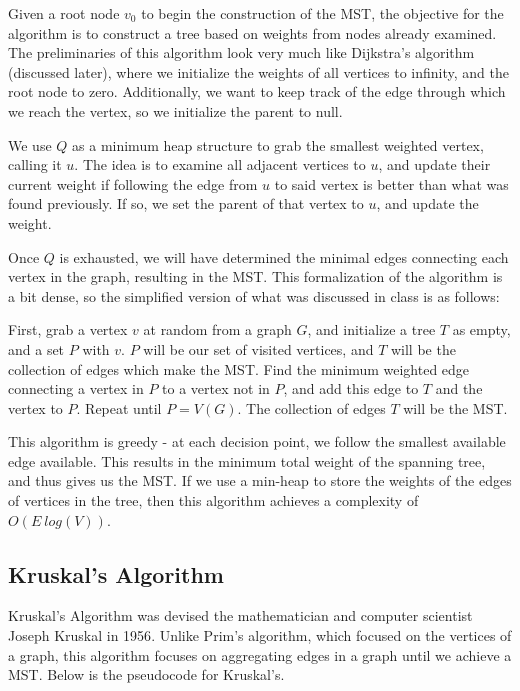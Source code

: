 Given a root node $v_0$ to begin the construction of the MST, the objective for the algorithm is to construct a tree based on weights from nodes already examined. The preliminaries of this algorithm look very much like Dijkstra's algorithm (discussed later), where we initialize the weights of all vertices to infinity, and the root node to zero. Additionally, we want to keep track of the edge through which we reach the vertex, so we initialize the parent to null. 

We use $Q$ as a minimum heap structure to grab the smallest weighted vertex, calling it $u$. The idea is to examine all adjacent vertices to $u$, and update their current weight if following the edge from $u$ to said vertex is better than what was found previously. If so, we set the parent of that vertex to $u$, and update the weight. 

Once $Q$ is exhausted, we will have determined the minimal edges connecting each vertex in the graph, resulting in the MST. This formalization of the algorithm is a bit dense, so the simplified version of what was discussed in class is as follows:

First, grab a vertex $v$ at random from a graph $G$, and initialize a tree $T$ as empty, and a set $P$ with $v$. $P$ will be our set of visited vertices, and $T$ will be the collection of edges which make the MST. Find the minimum weighted edge connecting a vertex in $P$ to a vertex not in $P$, and add this edge to $T$ and the vertex to $P$. Repeat until $P = V(G)$. The collection of edges $T$ will be the MST.

This algorithm is greedy - at each decision point, we follow the smallest available edge available. This results in the minimum total weight of the spanning tree, and thus gives us the MST. If we use a min-heap to store the weights of the edges of vertices in the tree, then this algorithm achieves a complexity of $O(E~log(V))$. 

\subsection{Kruskal's Algorithm}
Kruskal's Algorithm was devised the mathematician and computer scientist Joseph Kruskal in 1956\cite{KruskalsAlgo}. Unlike Prim's algorithm, which focused on the vertices of a graph, this algorithm focuses on aggregating edges in a graph until we achieve a MST. Below is the pseudocode for Kruskal's.

